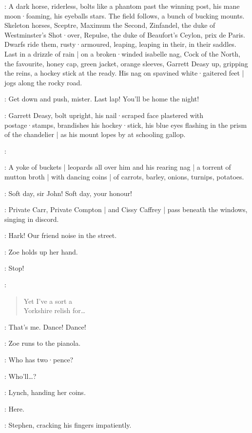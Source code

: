 :
A dark horse,
riderless,
bolts like a phantom past the winning post,
his mane moon·foaming,
his eyeballs stars.
The field follows,
a bunch of bucking mounts.
Skeleton horses,
Sceptre,
Maximum the Second,
Zinfandel,
the duke of Westminster's Shot·over,
Repulse,
the duke of Beaufort's Ceylon,
prix de Paris.
Dwarfs ride them,
rusty·armoured,
leaping,
leaping in their,
in their saddles.
Last in a drizzle of rain |
on a broken·winded isabelle nag,
%
Cock of the North,
the favourite,
honey cap,
green jacket,
orange sleeves,
Garrett Deasy up,
gripping the reins,
a hockey stick at the ready.
His nag on spavined white·gaitered feet |
jogs along the rocky road.

\OrangeLodges[6b]:
Get down and push,
mister.
Last lap!
You'll be home the night!

:
Garrett Deasy,
bolt upright,
his nail·scraped face plastered with postage·stamps,
brandishes his hockey·stick,
his blue eyes flashing in the prism of the chandelier |
as his mount lopes by at schooling gallop.

\GarrettDeasy:

:
A yoke of buckets |
leopards all over him and his rearing nag |
%
a torrent of mutton broth |
with dancing coins |
of carrots,
barley,
onions,
turnips,
potatoes.

\GreenLodges[6b]:
Soft day,
sir John!
Soft day,
your honour!

:
Private Carr,
Private Compton |
and Cissy Caffrey |
pass beneath the windows,
singing in discord.

\Stephen:
Hark!
Our friend noise in the street.

:
Zoe holds up her hand.

\Zoe:
Stop!

\CarrComptonCissy[6b]:
\begin{verse}
    Yet I've a sort a\\
    Yorkshire relish for…
\end{verse}

\Zoe:
That's me.
Dance!
Dance!

:
Zoe runs to the pianola.

\Zoe:
Who has two·pence?

\Bloom:
Who'll…?

:
Lynch,
handing her coins.

\Lynch:
Here.

:
Stephen,
cracking his fingers impatiently.

